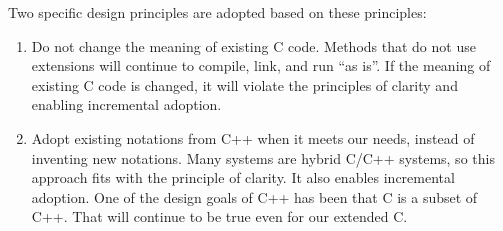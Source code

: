 Two specific design principles are adopted based on these principles:

\begin{enumerate}
\item
  Do not change the meaning of existing C code. Methods that do not use
  extensions will continue to compile, link, and run ``as is''. If the
  meaning of existing C code is changed, it will violate the principles
  of clarity and enabling incremental adoption.
\item
  Adopt existing notations from C++ when it meets our needs, instead of
  inventing new notations. Many systems are hybrid C/C++ systems, so
  this approach fits with the principle of clarity. It also enables
  incremental adoption. One of the design goals of C++ has been that C
  is a subset of C++. That will continue to be true even for our
  extended C.
\end{enumerate}
